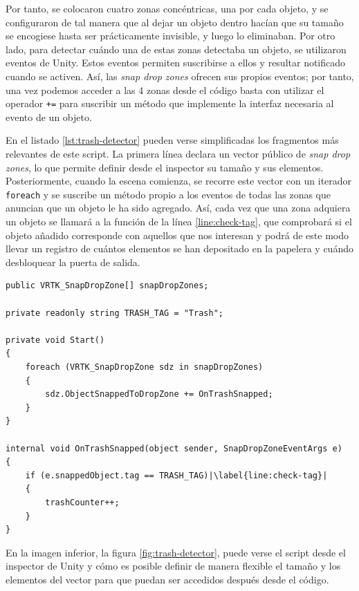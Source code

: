 Por tanto, se colocaron cuatro zonas concéntricas, una por cada objeto, y se configuraron de tal manera que al dejar un objeto dentro hacían que su tamaño se encogiese hasta ser prácticamente invisible, y luego lo eliminaban. Por otro lado, para detectar cuándo una de estas zonas detectaba un objeto, se utilizaron eventos de Unity. Estos eventos permiten suscribirse a ellos y resultar notificado cuando se activen. Así, las \textit{snap drop zones} ofrecen sus propios eventos; por tanto, una vez podemos acceder a las 4 zonas desde el código basta con utilizar el operador \texttt{+=} para suscribir un método que implemente la interfaz necesaria al evento de un objeto.

En el listado \ref{lst:trash-detector} pueden verse simplificadas los fragmentos más relevantes de este script. La primera línea declara un vector público de \textit{snap drop zones}, lo que permite definir desde el inspector su tamaño y sus elementos. Posteriormente, cuando la escena comienza, se recorre este vector con un iterador \texttt{foreach} y se suscribe un método propio a los eventos de todas las zonas que anuncian que un objeto le ha sido agregado. Así, cada vez que una zona adquiera un objeto se llamará a la función de la línea \ref{line:check-tag}, que comprobará si el objeto añadido corresponde con aquellos que nos interesan y podrá de este modo llevar un registro de cuántos elementos se han depositado en la papelera y cuándo desbloquear la puerta de salida. 

\begin{lstlisting}[caption=Fragmento del script para detectar piezas de basura, label=lst:trash-detector, escapechar=|]
public VRTK_SnapDropZone[] snapDropZones;

private readonly string TRASH_TAG = "Trash";

private void Start()
{
    foreach (VRTK_SnapDropZone sdz in snapDropZones)
    {
        sdz.ObjectSnappedToDropZone += OnTrashSnapped;
    }
}

internal void OnTrashSnapped(object sender, SnapDropZoneEventArgs e)
{
    if (e.snappedObject.tag == TRASH_TAG)|\label{line:check-tag}|
    {
        trashCounter++;
    }
}
\end{lstlisting}

En la imagen inferior, la figura \ref{fig:trash-detector}, puede verse el script desde el inspector de Unity y cómo es posible definir de manera flexible el tamaño y los elementos del vector para que puedan ser accedidos después desde el código. 

